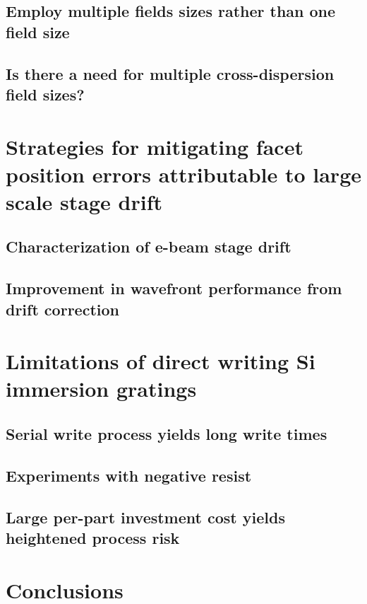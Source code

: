 \documentclass[]{spie}  %
\begin{document}
\subsection{Employ multiple fields sizes rather than one field size}
\label{sec:MultipleFields}


\subsection{Is there a need for multiple cross-dispersion field sizes?}
\section{Strategies for mitigating facet position errors attributable to large scale stage drift}
\subsection{Characterization of e-beam stage drift}
\subsection{Improvement in wavefront performance from drift correction}
\section{Limitations of direct writing Si immersion gratings}
\subsection{Serial write process yields long write times}
\subsection{Experiments with negative resist}
\subsection{Large per-part investment cost yields heightened process risk}
\section{Conclusions}




\end{document}
